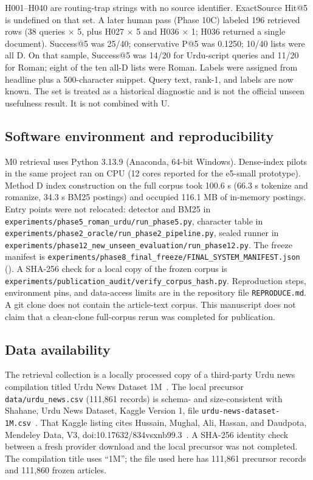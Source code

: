 \documentclass[10pt,letterpaper]{article}
\begin{document}
H001--H040 are routing-trap strings with no source identifier. ExactSource Hit@5 is undefined on that set. A later human pass (Phase 10C) labeled 196 retrieved rows (38 queries $\times$ 5, plus H027 $\times$ 5 and H036 $\times$ 1; H036 returned a single document). Success@5 was 25/40; conservative P@5 was 0.1250; 10/40 lists were all D. On that sample, Success@5 was 14/20 for Urdu-script queries and 11/20 for Roman; eight of the ten all-D lists were Roman. Labels were assigned from headline plus a 500-character snippet. Query text, rank-1, and labels are now known. The set is treated as a historical diagnostic and is not the official unseen usefulness result. It is not combined with U.

\subsection*{Software environment and reproducibility}

M0 retrieval uses Python 3.13.9 (Anaconda, 64-bit Windows). Dense-index pilots in the same project ran on CPU (12 cores reported for the e5-small prototype). Method D index construction on the full corpus took 100.6 s (66.3 s tokenize and romanize, 34.3 s BM25 postings) and occupied 116.1 MB of in-memory postings. Entry points were not relocated: detector and BM25 in \texttt{experiments/phase5\_roman\_urdu/run\_phase5.py}, character table in \texttt{experiments/phase2\_oracle/run\_phase2\_pipeline.py}, sealed runner in \texttt{experiments/phase12\_new\_unseen\_evaluation/run\_phase12.py}. The freeze manifest is \texttt{experiments/phase8\_final\_freeze/FINAL\_SYSTEM\_MANIFEST.json} (). A SHA-256 check for a local copy of the frozen corpus is \texttt{experiments/publication\_audit/verify\_corpus\_hash.py}. Reproduction steps, environment pins, and data-access limits are in the repository file \texttt{REPRODUCE.md}. A git clone does not contain the article-text corpus. This manuscript does not claim that a clean-clone full-corpus rerun was completed for publication.

\subsection*{Data availability}

The retrieval collection is a locally processed copy of a third-party Urdu news compilation titled Urdu News Dataset 1M~\cite{bib16}. The local precursor \texttt{data/urdu\_news.csv} (111,861 records) is schema- and size-consistent with Shahane, Urdu News Dataset, Kaggle Version 1, file \texttt{urdu-news-dataset-1M.csv}~\cite{bib17}. That Kaggle listing cites Hussain, Mughal, Ali, Hassan, and Daudpota, Mendeley Data, V3, doi:10.17632/834vsxnb99.3~\cite{bib16}. A SHA-256 identity check between a fresh provider download and the local precursor was not completed. The compilation title uses ``1M''; the file used here has 111,861 precursor records and 111,860 frozen articles.
\end{document}
